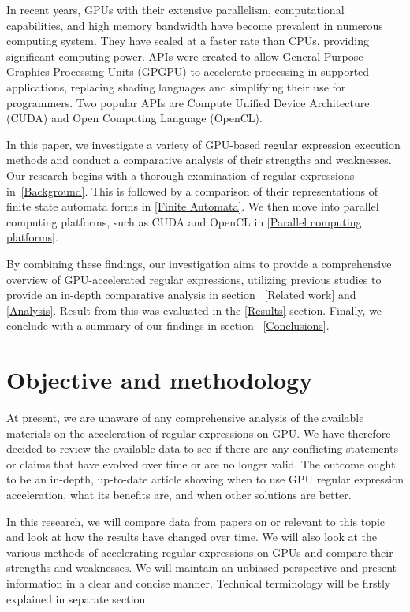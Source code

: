 \documentclass[10pt,onecolumn,twoside,english,a4paper]{article}
\begin{document}
In recent years, GPUs with their extensive parallelism, computational capabilities, and high memory bandwidth have become prevalent in numerous computing system. They have scaled at a faster rate than CPUs, providing significant computing power\cite{sun2019summarizing,Liu:Asynchronous}. APIs were created to allow General Purpose Graphics Processing Units (GPGPU) to accelerate processing in supported applications, replacing shading languages and simplifying their use for programmers. Two popular APIs are Compute Unified Device Architecture (CUDA) and Open Computing Language (OpenCL)\cite{Fang:Comparison-cuda-opencl}.

In this paper, we investigate a variety of GPU-based regular expression execution methods and conduct a comparative analysis of their strengths and weaknesses. Our research begins with a thorough examination of regular expressions in~\ref{Background}. This is followed by a comparison of their representations of finite state automata forms in \ref{Finite Automata}. We then move into parallel computing platforms, such as CUDA and OpenCL in \ref{Parallel computing platforms}.

By combining these findings, our investigation aims to provide a comprehensive overview of GPU-accelerated regular expressions, utilizing previous studies to provide an in-depth comparative analysis in section ~\ref{Related work} and \ref{Analysis}. Result from this was evaluated in the \ref{Results} section. Finally, we conclude with a summary of our findings in section ~\ref{Conclusions}.

\section{Objective and methodology} \label{Objective}
At present, we are unaware of any comprehensive analysis of the available materials on the acceleration of regular expressions on GPU. We have therefore decided to review the available data to see if there are any conflicting statements or claims that have evolved over time or are no longer valid. The outcome ought to be an in-depth, up-to-date article showing when to use GPU regular expression acceleration, what its benefits are, and when other solutions are better.

In this research, we will compare data from papers on or relevant to this topic and look at how the results have changed over time. We will also look at the various methods of accelerating regular expressions on GPUs and compare their strengths and weaknesses.
We will maintain an unbiased perspective and present information in a clear and concise manner. Technical terminology will be firstly explained in separate section.
\end{document}
